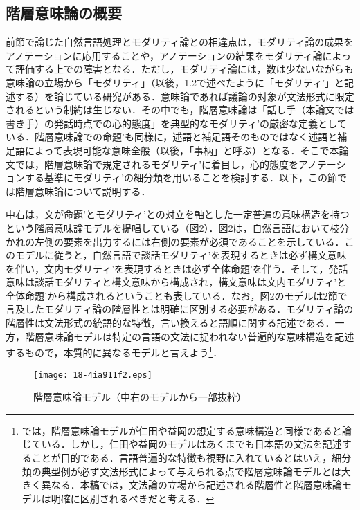 \documentclass[japanese]{jnlp_1.4}
\begin{document}
\subsection{階層意味論の概要}

前節で論じた自然言語処理とモダリティ論との相違点は，モダリティ論の成果をアノテーションに応用することや，アノテーションの結果をモダリティ論によって評価する上での障害となる．ただし，モダリティ論には，数は少ないながらも意味論の立場から「モダリティ」（以後，1.2で述べたように「モダリティ’」と記述する）を論じている研究がある．意味論であれば議論の対象が文法形式に限定されるという制約は生じない．その中でも，階層意味論\cite{Book_13}は「話し手（本論文では書き手）の発話時点での心的態度」を典型的なモダリティ’の厳密な定義としている．階層意味論での命題’も同様に，述語と補足語そのものではなく述語と補足語によって表現可能な意味全般（以後，「事柄」と呼ぶ）となる．そこで本論文では，階層意味論で規定されるモダリティ’に着目し，心的態度をアノテーションする基準にモダリティ’の細分類を用いることを検討する．以下，この節では階層意味論について説明する．

中右は，文が命題’とモダリティ’との対立を軸とした一定普遍の意味構造を持つという階層意味論モデルを提唱している（図2）．図2は，自然言語において枝分かれの左側の要素を出力するには右側の要素が必須であることを示している．このモデルに従うと，自然言語で談話モダリティ’を表現するときは必ず構文意味を伴い，文内モダリティ’を表現するときは必ず全体命題’を伴う．そして，発話意味は談話モダリティと構文意味から構成され，構文意味は文内モダリティ’と全体命題’から構成されるということも表している．なお，図2のモデルは2節で言及したモダリティ論の階層性\cite{Book_01,Book_04}とは明確に区別する必要がある．モダリティ論の階層性は文法形式の統語的な特徴，言い換えると語順に関する記述である．一方，階層意味論モデルは特定の言語の文法に捉われない普遍的な意味構造を記述するもので，本質的に異なるモデルと言えよう\footnote{\cite{Book_01}では，階層意味論モデルが仁田や益岡の想定する意味構造と同様であると論じている．しかし，仁田や益岡のモデルはあくまでも日本語の文法を記述することが目的である．言語普遍的な特徴も視野に入れているとはいえ，細分類の典型例が必ず文法形式によって与えられる点で階層意味論モデルとは大きく異なる．本稿では，文法論の立場から記述される階層性と階層意味論モデルは明確に区別されるべきだと考える．}．

\begin{figure}[t]
 \begin{center}
  \texttt{[image: 18-4ia911f2.eps]}
 \end{center}
 \caption{階層意味論モデル（中右のモデルから一部抜粋）}
 \label{fig:two}
\end{figure}
\end{document}
